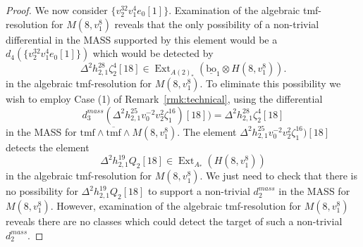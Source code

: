 \documentclass[10pt]{amsart}
\newcommand{\ul}[1]{\underline{#1}}
\newcommand{\br}[1]{\overline{#1}}
\newcommand{\tmf}{\mathrm{tmf}}
\newcommand{\bo}{\mathrm{bo}}
\newcommand{\bou}{\ul{\bo}}
\theoremstyle{definition}
\numberwithin{equation}{section}
\numberwithin{figure}{section}
\DeclareMathOperator{\Ext}{Ext}
\begin{document}
\begin{proof}
We now consider $\{v_2^{32}v_1^4e_0[1]\}$.
Examination of the algebraic tmf-resolution for $M(8,v_1^8)$ reveals that the only possibility of a non-trivial differential in the MASS supported by this element would be a $d_4(\{v_2^{32} v_1^4e_0[1]\})$ which would be detected by 
$$ \Delta^2 h^{28}_{2,1}\zeta_2^4[18] \in \Ext_{A(2)_*}(\bou_1 \otimes H(8,v_1^8)). $$
in the algebraic tmf-resolution for $M(8,v_1^8)$.
To eliminate this possibility we wish to employ 
Case (1) of Remark~\ref{rmk:technical}, using the differential
$$ d^{mass}_3(\Delta^2 h^{25}_{2,1}v_0^{-2}v_2^2\zeta_1^{16})[18]) = \Delta^2 h_{2,1}^{28} \zeta_2^4[18] $$
in the MASS for $\tmf \wedge \br{\tmf} \wedge M(8,v_1^8)$.
The element $\Delta^2 h^{25}_{2,1}v_0^{-2}v_2^2\zeta_1^{16})[18]$ detects the element
$$ \Delta^2 h^{19}_{2,1} Q_2[18] \in \Ext_{A_*}(H(8,v_1^8)) $$
in the algebraic tmf-resolution for $M(8,v_1^8)$.  We just need to check that there is no possibility for $\Delta^2 h^{19}_{2,1} Q_2[18]$ to support a non-trivial $d^{mass}_2$ in the MASS for $M(8,v_1^8)$.  However, examination of the algebraic tmf-resolution for $M(8,v_1^8)$ reveals there are no classes which could detect the target of such a non-trivial $d^{mass}_2$.
\end{proof}





\nocite{*}

\end{document}
